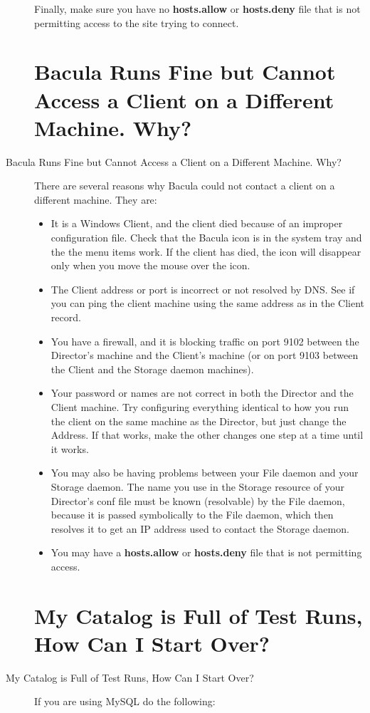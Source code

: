 \begin{description}
   Finally, make sure you have no {\bf hosts.allow} or {\bf hosts.deny}
   file that is not permitting access to the site trying to connect.

\label{AccessProblems}
\section{Bacula Runs Fine but Cannot Access a Client on a Different Machine.
   Why? }
\item [Bacula Runs Fine but Cannot Access a Client on a Different Machine.
   Why? ]
   There are several reasons why Bacula could not contact a client  on a
   different machine. They are:  

\begin{itemize}
\item It is a Windows Client, and the client died because of an  improper
   configuration file. Check that the Bacula icon is in  the system tray and the
   the menu items work. If the client has  died, the icon will disappear only
   when you move the mouse over  the icon.  
\item The Client address or port is incorrect or not resolved by  DNS. See if
   you can ping the client machine using the same  address as in the Client
   record.  
\item You have a firewall, and it is blocking traffic on port  9102 between
   the Director's machine and the Client's  machine (or on port 9103 between the
   Client and the Storage daemon  machines).  
\item Your password or names are not correct in both the Director and  the
   Client machine. Try configuring everything identical to  how you run the
   client on the same machine as the Director, but  just change the Address. If
   that works, make the other changes  one step at a time until it works.  
\item You may also be having problems between your File daemon and your
   Storage daemon. The name you use in the Storage resource of your
   Director's conf file must be known (resolvable) by the File daemon, 
   because it is passed symbolically to the File daemon, which then
   resolves it to get an IP address used to contact the Storage daemon.
\item You may have a {\bf hosts.allow} or {\bf hosts.deny} file that is
   not permitting access.
\end{itemize}

\label{startover}
\section{My Catalog is Full of Test Runs, How Can I Start Over?}
\item [My Catalog is Full of Test Runs, How Can I Start Over? ]
  If you are using MySQL do the following:


\end{description}
